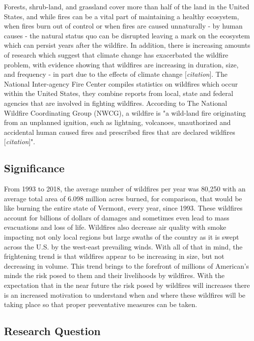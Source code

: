 \documentclass[12pt]{article}
\begin{document}
Forests, shrub-land, and grassland cover more than half of the land in the United States, and while fires can be a vital part of maintaining a healthy ecosystem, when fires burn out of control or when fires are caused unnaturally - by human causes -  the natural status quo can be disrupted leaving a mark on the ecosystem which can persist years after the wildfire. In addition, there is increasing amounts of research which suggest that climate change has exacerbated the wildfire problem, with evidence showing that wildfires are increasing in duration, size, and frequency - in part due to the effects of climate change [\textit{citation}]. The National Inter-agency Fire Center compiles statistics on wildfires which occur within the United States, they combine reports from local, state and federal agencies that are involved in fighting wildfires. According to The National Wildfire Coordinating Group (NWCG), a wildfire is "a wild-land fire originating from an unplanned ignition, such as lightning, volcanoes, unauthorized and accidental human caused fires and prescribed fires that are declared wildfires [\textit{citation}]". 

\subsection{\textrm{Significance}} 

From 1993 to 2018, the average number of wildfires per year was 80,250 with an average total area of 6.098 million acres burned, for comparison, that would be like burning the entire state of Vermont, every year, since 1993. These wildfires account for billions of dollars of damages and sometimes even lead to mass evacuations and loss of life. Wildfires also decrease air quality with smoke impacting not only local regions but large swaths of the country as it is swept across the U.S. by the west-east prevailing winds. With all of that in mind, the frightening trend is that wildfires appear to be increasing in size, but not decreasing in volume. This trend brings to the forefront of millions of American's minds the risk posed to them and their livelihoods by wildfires. With the expectation that in the near future the risk posed by wildfires will increases there is an increased motivation to understand when and where these wildfires will be taking place so that proper preventative measures can be taken. \\

\subsection{\textrm{Research Question}}
\end{document}
